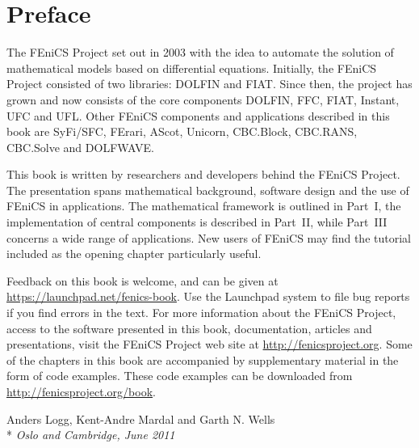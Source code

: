 \chapter*{Preface}

\thispagestyle{empty}

The FEniCS Project set out in 2003 with the idea to automate the
solution of mathematical models based on differential equations.
Initially, the FEniCS Project consisted of two libraries: DOLFIN and
FIAT. Since then, the project has grown and now consists of the core
components DOLFIN, FFC, FIAT, Instant, UFC and UFL. Other FEniCS
components and applications described in this book are SyFi/SFC,
FErari, AScot, Unicorn, CBC.Block, CBC.RANS, CBC.Solve and DOLFWAVE.

This book is written by researchers and developers behind the FEniCS
Project. The presentation spans mathematical background, software
design and the use of FEniCS in applications. The mathematical
framework is outlined in Part~I, the implementation of central
components is described in Part~II, while Part~III concerns a wide
range of applications. New users of FEniCS may find the tutorial
included as the opening chapter particularly useful.

Feedback on this book is welcome, and can be given at
\url{https://launchpad.net/fenics-book}. Use the Launchpad system to
file bug reports if you find errors in the text. For more information
about the FEniCS Project, access to the software presented in this
book, documentation, articles and presentations, visit the FEniCS
Project web site at \url{http://fenicsproject.org}. Some of the
chapters in this book are accompanied by supplementary material in the
form of code examples. These code examples can be downloaded from
\url{http://fenicsproject.org/book}.

\vspace{1em}

\noindent
Anders Logg, Kent-Andre Mardal and Garth N. Wells \\*
\emph{Oslo and Cambridge, June 2011}
